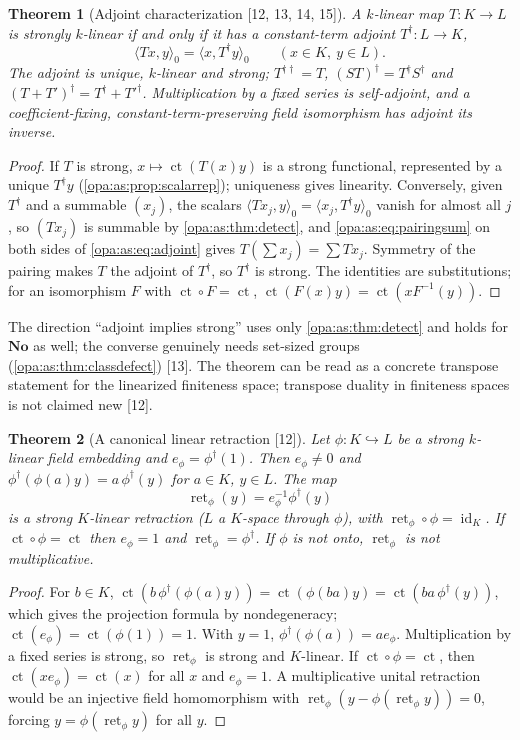 \documentclass[11pt,oneside]{article}
\numberwithin{equation}{section}
\newtheorem{theorem}{Theorem}[section]
\theoremstyle{definition}
\theoremstyle{remark}
\newcommand{\No}{\mathbf{No}}
\newcommand{\ct}{\operatorname{ct}}
\newcommand{\id}{\operatorname{id}}
\newcommand{\src}[1]{\textup{\textsf{\small[#1]}}}
\newcommand{\pairing}[2]{\langle #1,#2\rangle_0}
\newcommand{\ret}{\operatorname{ret}}
\begin{document}
\begin{theorem}[Adjoint characterization \src{12, 13, 14, 15}]\label{opa:as:thm:adjoint}
A $k$-linear map $T:K\to L$ is strongly $k$-linear if and only if it has a
\emph{constant-term adjoint} $T^\dagger:L\to K$,
\begin{equation}\label{opa:as:eq:adjoint}
 \pairing{Tx}y=\pairing x{T^\dagger y}\qquad(x\in K,\ y\in L).
\end{equation}
The adjoint is unique, $k$-linear and strong; $T^{\dagger\dagger}=T$, $(ST)^\dagger=T^\dagger
S^\dagger$ and $(T+T')^\dagger=T^\dagger+T'^\dagger$. Multiplication by a fixed series is
self-adjoint, and a coefficient-fixing, constant-term-preserving field isomorphism has
adjoint its inverse.
\end{theorem}
\begin{proof}
If $T$ is strong, $x\mapsto\ct(T(x)y)$ is a strong functional, represented by a unique
$T^\dagger y$ (\cref{opa:as:prop:scalarrep}); uniqueness gives linearity. Conversely, given
$T^\dagger$ and a summable $(x_j)$, the scalars $\pairing{Tx_j}y=\pairing{x_j}{T^\dagger y}$
vanish for almost all $j$, so $(Tx_j)$ is summable by \cref{opa:as:thm:detect}, and
\eqref{opa:as:eq:pairingsum} on both sides of \eqref{opa:as:eq:adjoint} gives
$T(\sum x_j)=\sum Tx_j$. Symmetry of the pairing makes $T$ the adjoint of $T^\dagger$, so
$T^\dagger$ is strong. The identities are substitutions; for an isomorphism $F$ with
$\ct\circ F=\ct$, $\ct(F(x)y)=\ct(xF^{-1}(y))$.
\end{proof}

The direction ``adjoint implies strong'' uses only \cref{opa:as:thm:detect} and holds for
$\No$ as well; the converse genuinely needs set-sized groups
(\cref{opa:as:thm:classdefect}) \src{13}. The theorem can be read as a concrete transpose
statement for the linearized finiteness space; transpose duality in finiteness spaces is not
claimed new \src{12}.

\begin{theorem}[A canonical linear retraction \src{12}]\label{opa:as:thm:retraction}
Let $\phi:K\hookrightarrow L$ be a strong $k$-linear field embedding and $e_\phi=\phi^\dagger(1)$.
Then $e_\phi\ne0$ and $\phi^\dagger(\phi(a)y)=a\,\phi^\dagger(y)$ for $a\in K$, $y\in L$. The map
\[
 \ret_\phi(y)=e_\phi^{-1}\phi^\dagger(y)
\]
is a strong $K$-linear retraction ($L$ a $K$-space through $\phi$), with $\ret_\phi\circ\phi=\id_K$.
If $\ct\circ\phi=\ct$ then $e_\phi=1$ and $\ret_\phi=\phi^\dagger$. If $\phi$ is not onto,
$\ret_\phi$ is not multiplicative.
\end{theorem}
\begin{proof}
For $b\in K$, $\ct(b\,\phi^\dagger(\phi(a)y))=\ct(\phi(ba)y)=\ct(ba\,\phi^\dagger(y))$, which gives the
projection formula by nondegeneracy; $\ct(e_\phi)=\ct(\phi(1))=1$. With $y=1$,
$\phi^\dagger(\phi(a))=ae_\phi$. Multiplication by a fixed series is strong, so $\ret_\phi$ is
strong and $K$-linear. If $\ct\circ\phi=\ct$, then $\ct(xe_\phi)=\ct(x)$ for all $x$ and
$e_\phi=1$. A multiplicative unital retraction would be an injective field homomorphism with
$\ret_\phi(y-\phi(\ret_\phi y))=0$, forcing $y=\phi(\ret_\phi y)$ for all $y$.
\end{proof}
\end{document}
